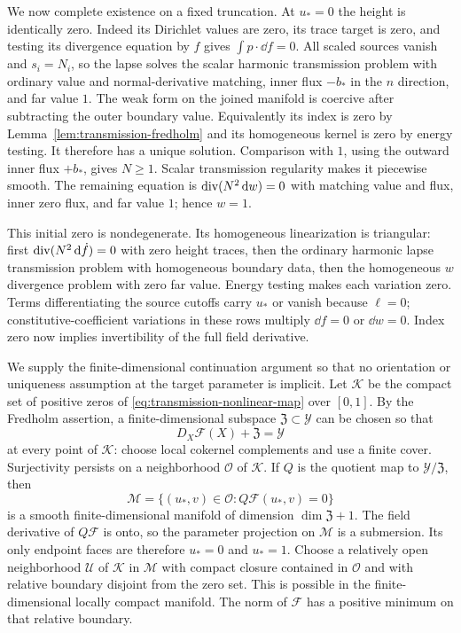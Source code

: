 We now complete existence on a fixed truncation.  At $u_*=0$ the
height is identically zero.  Indeed its Dirichlet values are zero,
its trace target is zero, and testing its divergence equation by
$f$ gives $\int p\cdot\dd f=0$.  All scaled sources vanish and
$s_i=N_i$, so the lapse solves the scalar harmonic transmission
problem with ordinary value and normal-derivative matching, inner
flux $-b_*$ in the $n$ direction, and far value $1$.  The weak
form on the joined manifold is coercive after subtracting the
outer boundary value.  Equivalently its index is zero by
Lemma~\ref{lem:transmission-fredholm} and its homogeneous kernel
is zero by energy testing.  It therefore has a unique solution.
Comparison with $1$, using the outward inner flux $+b_*$, gives
$N\geq1$.  Scalar transmission regularity makes it piecewise
smooth.  The remaining equation is
$\operatorname{div}(N^2\mathop{}\!\mathrm d w)=0$ with matching value and flux, inner zero
flux, and far value $1$; hence $w=1$.

This initial zero is nondegenerate.  Its homogeneous linearization
is triangular: first
$\operatorname{div}(N^2\mathop{}\!\mathrm d\dot f)=0$ with zero height traces, then the
ordinary harmonic lapse transmission problem with homogeneous
boundary data, then the homogeneous $w$ divergence problem with
zero far value.  Energy testing makes each variation zero.
Terms differentiating the source cutoffs carry $u_*$ or vanish
because $\ell=0$; constitutive-coefficient variations in these
rows multiply $\dd f=0$ or $\dd w=0$.  Index zero now implies
invertibility of the full field derivative.

We supply the finite-dimensional continuation argument so that no
orientation or uniqueness assumption at the target parameter is
implicit.  Let $\mathcal K$ be the compact set of positive zeros
of \eqref{eq:transmission-nonlinear-map} over $[0,1]$.  By the
Fredholm assertion, a finite-dimensional subspace
$\mathfrak Z\subset\mathscr Y$ can be chosen so that
\begin{equation}
 D_X\mathscr F(X)+\mathfrak Z=\mathscr Y
 \label{eq:transmission-cokernel-span}
\end{equation}
at every point of $\mathcal K$: choose local cokernel complements
and use a finite cover.  Surjectivity persists on a neighborhood
$\mathcal O$ of $\mathcal K$.  If $Q$ is the quotient map to
$\mathscr Y/\mathfrak Z$, then
\begin{equation}
 \mathcal M=\{(u_*,v)\in\mathcal O:
                               Q\mathscr F(u_*,v)=0\}
 \label{eq:transmission-reduction-manifold}
\end{equation}
is a smooth finite-dimensional manifold of dimension
$\dim\mathfrak Z+1$.  The field derivative of $Q\mathscr F$
is onto, so the parameter projection on $\mathcal M$ is a
submersion.  Its only endpoint faces are therefore $u_*=0$ and
$u_*=1$.  Choose a relatively open neighborhood $\mathcal U$ of
$\mathcal K$ in $\mathcal M$ with compact closure contained in
$\mathcal O$ and with relative boundary disjoint from the zero
set.  This is possible in the finite-dimensional locally compact
manifold.  The norm of $\mathscr F$ has a positive minimum on
that relative boundary.


